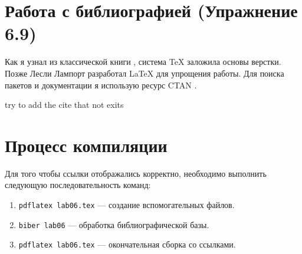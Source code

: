 \documentclass[a4paper, 12pt]{article}
\begin{document}
	
	\section{Работа с библиографией (Упражнение 6.9)}
	
	Как я узнал из классической книги \cite{knuth1984}, система TeX заложила основы верстки. 
	Позже Лесли Лампорт \cite{lamport1986} разработал LaTeX для упрощения работы. 
	Для поиска пакетов и документации я использую ресурс CTAN \cite{ctan2026}.
	

	try to add the cite that not exits\cite{test}
	
	\section{Процесс компиляции}
	Для того чтобы ссылки отображались корректно, необходимо выполнить следующую последовательность команд:
	\begin{enumerate}
		\item \texttt{pdflatex lab06.tex} --- создание вспомогательных файлов.
		\item \texttt{biber lab06} --- обработка библиографической базы.
		\item \texttt{pdflatex lab06.tex} --- окончательная сборка со ссылками.
	\end{enumerate}
	
	\printbibliography[title={Список литературы}]
	
\end{document}
